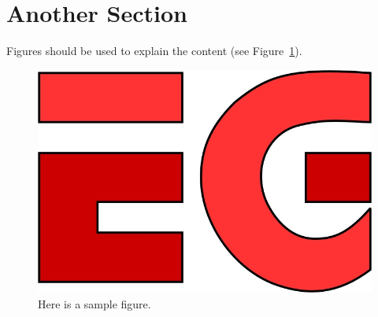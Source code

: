\documentclass{egpubl}
\begin{document}
\section{Another Section}

Figures should be used to explain the content (see Figure~\ref{fig:firstExample}).

\begin{figure}[htb]
  \centering
  \includegraphics[width=.8\linewidth]{sampleFig}
  \caption{Here is a sample figure.}
  \label{fig:firstExample}
\end{figure}





\end{document}
